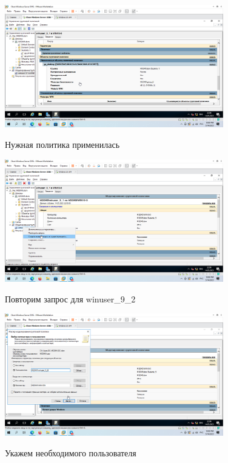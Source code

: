 \documentclass[a4paper]{article}
\begin{document}
  \begin{figure}[H]
    \centering
    \includegraphics[width=0.85\textwidth]{5_0171}
    \label{img:171}
    \caption{Нужная политика применилась}
  \end{figure}

  \begin{figure}[H]
    \centering
    \includegraphics[width=0.85\textwidth]{5_0172}
    \label{img:172}
    \caption{Повторим запрос для winuser\_9\_2}
  \end{figure}

  \begin{figure}[H]
    \centering
    \includegraphics[width=0.85\textwidth]{5_0173}
    \label{img:173}
    \caption{Укажем необходимого пользователя}
  \end{figure}
\end{document}
